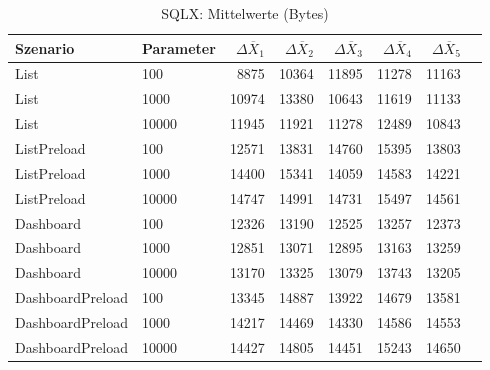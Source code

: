 
\begin{table}[ht]
\setlength{\extrarowheight}{-1pt}
\centering
\caption{SQLX: Mittelwerte (Bytes)}
\begin{tabular}{llrrrrrr}
\toprule
Szenario & Parameter & ${\Delta \overline{X}_1}$ & ${\Delta \overline{X}_2}$ & ${\Delta \overline{X}_3}$ & ${\Delta \overline{X}_4}$ & ${\Delta \overline{X}_5}$ \\
\midrule
	List & 100 & 8875 & 10364 & 11895 & 11278 & 11163 \\
	List & 1000 & 10974 & 13380 & 10643 & 11619 & 11133 \\
	List & 10000 & 11945 & 11921 & 11278 & 12489 & 10843 \\
	ListPreload & 100 & 12571 & 13831 & 14760 & 15395 & 13803 \\
	ListPreload & 1000 & 14400 & 15341 & 14059 & 14583 & 14221 \\
	ListPreload & 10000 & 14747 & 14991 & 14731 & 15497 & 14561 \\
	Dashboard & 100 & 12326 & 13190 & 12525 & 13257 & 12373 \\
	Dashboard & 1000 & 12851 & 13071 & 12895 & 13163 & 13259 \\
	Dashboard & 10000 & 13170 & 13325 & 13079 & 13743 & 13205 \\
	DashboardPreload & 100 & 13345 & 14887 & 13922 & 14679 & 13581 \\
	DashboardPreload & 1000 & 14217 & 14469 & 14330 & 14586 & 14553 \\
	DashboardPreload & 10000 & 14427 & 14805 & 14451 & 15243 & 14650 \\
\bottomrule
\end{tabular}
\label{tab:mittelwerte_sqlx_bytes}
\end{table}
	